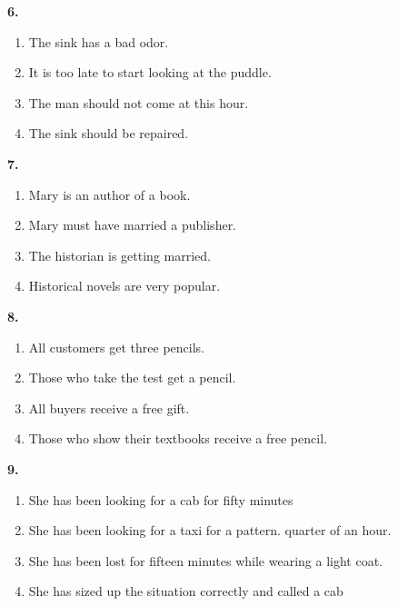 \documentclass[12pt]{article}
\begin{document}
\par
\vspace{0.25\baselineskip}
\noindent\textbf{6.}
\begin{enumerate}[label=(\Alph*),leftmargin=*,itemsep=0.2em]
\item The sink has a bad odor.
\item It is too late to start looking at the puddle.
\item The man should not come at this hour.
\item The sink should be repaired.
\end{enumerate}
\par
\vspace{0.25\baselineskip}
\noindent\textbf{7.}
\begin{enumerate}[label=(\Alph*),leftmargin=*,itemsep=0.2em]
\item Mary is an author of a book.
\item Mary must have married a publisher.
\item The historian is getting married.
\item Historical novels are very popular.
\end{enumerate}
\par
\vspace{0.25\baselineskip}
\noindent\textbf{8.}
\begin{enumerate}[label=(\Alph*),leftmargin=*,itemsep=0.2em]
\item All customers get three pencils.
\item Those who take the test get a pencil.
\item All buyers receive a free gift.
\item Those who show their textbooks receive a free pencil.
\end{enumerate}
\par
\vspace{0.25\baselineskip}
\noindent\textbf{9.}
\begin{enumerate}[label=(\Alph*),leftmargin=*,itemsep=0.2em]
\item She has been looking for a cab for fifty minutes
\item She has been looking for a taxi for a pattern. quarter of an hour.
\item She has been lost for fifteen minutes while wearing a light coat.
\item She has sized up the situation correctly and called a cab
\end{enumerate}
\par
\end{document}
